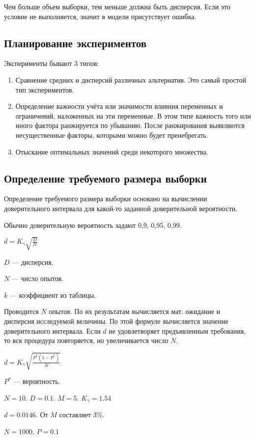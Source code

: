 \documentclass[12pt, russian, oneside, article]{ncc}
\begin{document}
Чем больше объем выборки, тем меньше должна быть дисперсия. Если это условие не выполняется, значит в модели присутствует ошибка.
\subsection{Планирование экспериментов}
\label{sec-7_4}


Эксперименты бывают 3 типов:
\begin{enumerate}
\item Сравнение средних и дисперсий различных альтернатив. Это самый простой тип экспериментов.
\item Определение важности учёта или значимости влияния переменных и ограничений, наложенных на эти переменные. В этом типе важность того или иного фактора ранжируется по убыванию. После ранжирования выявляются несущественные факторы, которыми можно будет пренебрегать.
\item Отыскание оптимальных значений среди некоторого множества.
\end{enumerate}
\subsection{Определение требуемого размера выборки}
\label{sec-7_5}


Определение требуемого размера выборки основано на вычислении доверительного интервала для какой-то заданной доверительной вероятности.

Обычно доверительную вероятность задают 0,9, 0,95, 0,99.

$d = K_{\gamma} \sqrt{\frac{D}{N}}$

$D$ --- дисперсия.

$N$ --- число опытов.

$k$ --- коэффициент из таблицы.

Проводится $N$ опытов. По их результатам вычисляется мат. ожидание и дисперсия исследуемой величины. По этой формуле вычисляется значение доверительного интервала. Если $d$ не удовлетворяет предъявленным требования, то вся процедура повторяется, но увеличивается число $N$.

$d = K_{\gamma} \sqrt{\frac{P^{*}(1-P^{*})}{N}}$

$P^{*}$ --- вероятность.

$N = 10$. $D = 0.1$. $M = 5$. $K_{\gamma} = 1.54$

$d = 0.0146$. От $M$ составляет 3\%.

$N = 1000$. $P = 0.1$
\end{document}

